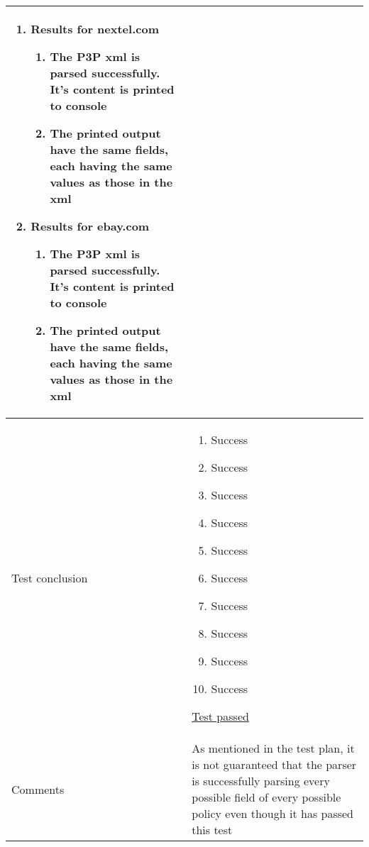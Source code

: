 \begin{center}
\begin{longtable}{ | p{4cm} | p{10cm} | }
\begin{enumerate}
							\item Results for nextel.com
							\begin{enumerate}
								\item The P3P xml is parsed successfully. It's content is printed to console
								\item The printed output have the same fields, each having the same values as those in the xml
							\end{enumerate}
					
							\item Results for ebay.com
							\begin{enumerate}
								\item The P3P xml is parsed successfully. It's content is printed to console
								\item The printed output have the same fields, each having the same values as those in the xml
							\end{enumerate}
						\end{enumerate}
							 \\  [3pt] \hline

			Test conclusion & 	\begin{enumerate}
							\item Success
							\item Success
							\item Success
							\item Success
							\item Success
							\item Success
							\item Success
							\item Success
							\item Success
							\item Success
						\end{enumerate}
						\underline{Test passed} \\  [3pt] \hline
			Comments & As mentioned in the test plan, it is not guaranteed that the parser is successfully parsing every possible field of every possible policy even though it has passed this test
					\\ [3pt] \hline
		\end{longtable}
	\end{center}

